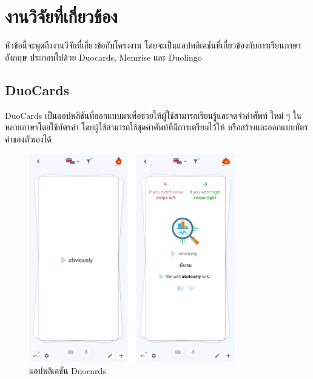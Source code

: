 \documentclass[12pt,oneside,openright,a4paper]{cpe-thai-project}
\begin{document}
\pagebreak
\section{งานวิจัยที่เกี่ยวข้อง}

\hspace{1cm}
หัวข้อนี้จะพูดถึงงานวิจัยที่เกี่ยวข้อกับโครงงาน โดยจะเป็นแอปพลิเคชันที่เกี่ยวข้องกับการเรียนภาษาอังกฤษ
ประกอบไปด้วย Duocards, Memrise และ Duolingo

\subsection{DuoCards  \cite{DuoCards}}


\hspace{1cm}
DuoCards เป็นแอปพลิชันที่ออกแบบมาเพื่อช่วยให้ผู้ใช้สามารถเรียนรู้และจดจำคำศัพท์ ใหม่ ๆ ในหลายภาษาโดยใช้บัตรคำ
โดยผู้ใช้สามารถใช้ชุดคำศัพท์ที่มีการเตรียมไว้ให้ หรือสร้างและออกแบบบัตรคำของตัวเองได้

\begin{figure}[!h]\centering
	\includegraphics[width=0.8\textwidth, keepaspectratio=true]{image/chap2/duocardsEX.png}
	\caption{แอปพลิเคชัน Duocards}\label{fig:duocardsEx}
\end{figure}
\end{document}
